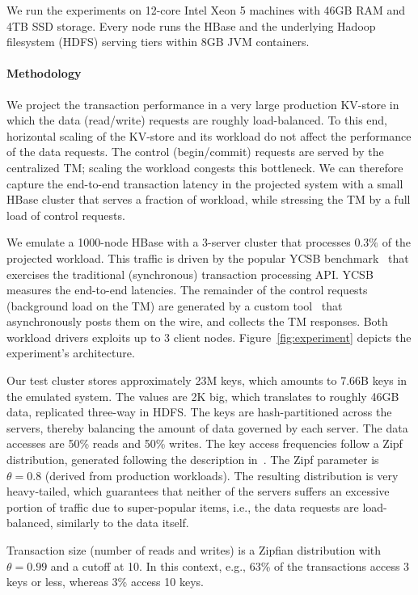 We run the experiments on 12-core Intel Xeon 5 machines with 46GB RAM and 4TB 
SSD storage. Every node runs the HBase and the underlying Hadoop filesystem (HDFS) 
serving tiers within 8GB JVM containers. 

\paragraph{Methodology}
We project the transaction performance in a very large production KV-store in which the data (read/write) 
requests are roughly load-balanced. To this end, horizontal scaling of the KV-store and its workload do not 
affect the performance of the data requests. The control (begin/commit) requests are served by the centralized 
TM; scaling the workload congests this bottleneck. We can therefore capture the end-to-end transaction latency
in the projected system with a small HBase cluster that serves a fraction of workload, while stressing the TM 
by a full load of control requests. 

We emulate a 1000-node HBase with a 3-server cluster that processes $0.3\%$ of the projected workload. 
This traffic is driven by the popular YCSB benchmark~\cite{Cooper:2010:BCS:1807128.1807152} 
that exercises the traditional (synchronous) transaction processing API. YCSB measures the end-to-end latencies.
The remainder of the control requests (background load on the TM) are generated by a custom tool~\cite{Omid2017} 
that asynchronously posts them on the wire, and collects the TM responses. Both workload
drivers exploits up to 3 client nodes. Figure~\ref{fig:experiment} depicts the experiment's architecture. 

Our test cluster stores approximately 23M keys, which amounts to 7.66B keys in the emulated system. 
The values are 2K big, which translates to roughly 46GB data, replicated three-way in HDFS. The keys are hash-partitioned
across the servers, thereby balancing the amount of data governed by each server. The data accesses are 50\% reads and 
50\% writes. The key access frequencies follow a Zipf distribution, generated following the description in~\cite{Gray:1994:QGB:191839.191886}. 
The Zipf parameter is $\theta=0.8$ (derived from production workloads). The resulting distribution is very heavy-tailed, which 
guarantees that neither of the servers suffers an excessive portion of traffic due to super-popular items, i.e., the 
data requests are load-balanced, similarly to the data itself.  

Transaction size (number of reads and writes) is a Zipfian distribution with $\theta=0.99$ and a cutoff at 10. 
In this context, e.g., 63\% of the transactions access 3 keys or less, whereas 3\% access 10 keys. 

